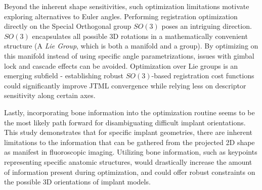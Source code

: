 Beyond the inherent shape sensitivities, such optimization limitations motivate exploring alternatives to Euler angles.
Performing registration optimization directly on the Special Orthogonal group $SO(3)$ poses an intriguing direction.
$SO(3)$ encapsulates all possible 3D rotations in a mathematically convenient structure (A \emph{Lie Group}, which is both a manifold and a group).
By optimizing on this manifold instead of using specific angle parametrizations, issues with gimbal lock and cascade effects can be avoided.
Optimization over Lie groups is an emerging subfield - establishing robust $SO(3)$-based registration cost functions could significantly improve JTML convergence while relying less on descriptor sensitivity along certain axes.

Lastly, incorporating bone information into the optimization routine seems to be the most likely path forward for disambiguating difficult implant orientations.
This study demonstrates that for specific implant geometries, there are inherent limitations to the information that can be gathered from the projected 2D shape as manifest in fluoroscopic imaging.
Utilizing bone information, such as keypoints representing specific anatomic structures, would drastically increase the amount of information present during optimization, and could offer robust constraints on the possible 3D orientations of implant models.



